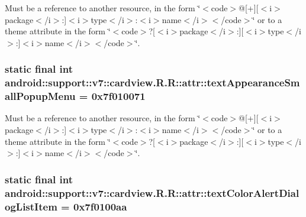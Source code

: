 Must be a reference to another resource, in the form \char`\"{}$<$code$>$@\mbox{[}+\mbox{]}\mbox{[}$<$i$>$package$<$/i$>$:\mbox{]}$<$i$>$type$<$/i$>$:$<$i$>$name$<$/i$>$$<$/code$>$\char`\"{} or to a theme attribute in the form \char`\"{}$<$code$>$?\mbox{[}$<$i$>$package$<$/i$>$:\mbox{]}\mbox{[}$<$i$>$type$<$/i$>$:\mbox{]}$<$i$>$name$<$/i$>$$<$/code$>$\char`\"{}. \hypertarget{classandroid_1_1support_1_1v7_1_1cardview_1_1_r_1_1attr_dfdd2f44599032bac981e62f139be188}{
\subsubsection[{textAppearanceSmallPopupMenu}]{\setlength{\rightskip}{0pt plus 5cm}static final int android::support::v7::cardview.R.R::attr::textAppearanceSmallPopupMenu = 0x7f010071}}
\label{classandroid_1_1support_1_1v7_1_1cardview_1_1_r_1_1attr_dfdd2f44599032bac981e62f139be188}


Must be a reference to another resource, in the form \char`\"{}$<$code$>$@\mbox{[}+\mbox{]}\mbox{[}$<$i$>$package$<$/i$>$:\mbox{]}$<$i$>$type$<$/i$>$:$<$i$>$name$<$/i$>$$<$/code$>$\char`\"{} or to a theme attribute in the form \char`\"{}$<$code$>$?\mbox{[}$<$i$>$package$<$/i$>$:\mbox{]}\mbox{[}$<$i$>$type$<$/i$>$:\mbox{]}$<$i$>$name$<$/i$>$$<$/code$>$\char`\"{}. \hypertarget{classandroid_1_1support_1_1v7_1_1cardview_1_1_r_1_1attr_4e3137ce7f13800c101ba42e647c1a20}{
\subsubsection[{textColorAlertDialogListItem}]{\setlength{\rightskip}{0pt plus 5cm}static final int android::support::v7::cardview.R.R::attr::textColorAlertDialogListItem = 0x7f0100aa}}
\label{classandroid_1_1support_1_1v7_1_1cardview_1_1_r_1_1attr_4e3137ce7f13800c101ba42e647c1a20}


